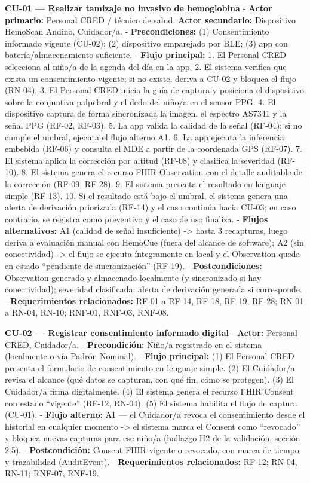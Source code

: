 \documentclass[11pt,a4paper]{article}
\begin{document}
\textbf{CU-01 --- Realizar tamizaje no invasivo de hemoglobina}
- \textbf{Actor primario:} Personal CRED / técnico de salud. \textbf{Actor secundario:} Dispositivo HemoScan Andino, Cuidador/a.
- \textbf{Precondiciones:} (1) Consentimiento informado vigente (CU-02); (2) dispositivo emparejado por BLE; (3) app con batería/almacenamiento suficiente.
- \textbf{Flujo principal:}
1. El Personal CRED selecciona al niño/a de la agenda del día en la app.
2. El sistema verifica que exista un consentimiento vigente; si no existe, deriva a CU-02 y bloquea el flujo (RN-04).
3. El Personal CRED inicia la guía de captura y posiciona el dispositivo sobre la conjuntiva palpebral y el dedo del niño/a en el sensor PPG.
4. El dispositivo captura de forma sincronizada la imagen, el espectro AS7341 y la señal PPG (RF-02, RF-03).
5. La app valida la calidad de la señal (RF-04); si no cumple el umbral, ejecuta el flujo alterno A1.
6. La app ejecuta la inferencia embebida (RF-06) y consulta el MDE a partir de la coordenada GPS (RF-07).
7. El sistema aplica la corrección por altitud (RF-08) y clasifica la severidad (RF-10).
8. El sistema genera el recurso FHIR Observation con el detalle auditable de la corrección (RF-09, RF-28).
9. El sistema presenta el resultado en lenguaje simple (RF-13).
10. Si el resultado está bajo el umbral, el sistema genera una alerta de derivación priorizada (RF-14) y el caso continúa hacia CU-03; en caso contrario, se registra como preventivo y el caso de uso finaliza.
- \textbf{Flujos alternativos:} A1 (calidad de señal insuficiente) -\textgreater{} hasta 3 recapturas, luego deriva a evaluación manual con HemoCue (fuera del alcance de software); A2 (sin conectividad) -\textgreater{} el flujo se ejecuta íntegramente en local y el Observation queda en estado ``pendiente de sincronización'' (RF-19).
- \textbf{Postcondiciones:} Observation generado y almacenado localmente (y sincronizado si hay conectividad); severidad clasificada; alerta de derivación generada si corresponde.
- \textbf{Requerimientos relacionados:} RF-01 a RF-14, RF-18, RF-19, RF-28; RN-01 a RN-04, RN-10; RNF-01, RNF-03, RNF-08.

\textbf{CU-02 --- Registrar consentimiento informado digital}
- \textbf{Actor:} Personal CRED, Cuidador/a.
- \textbf{Precondición:} Niño/a registrado en el sistema (localmente o vía Padrón Nominal).
- \textbf{Flujo principal:} (1) El Personal CRED presenta el formulario de consentimiento en lenguaje simple. (2) El Cuidador/a revisa el alcance (qué datos se capturan, con qué fin, cómo se protegen). (3) El Cuidador/a firma digitalmente. (4) El sistema genera el recurso FHIR Consent con estado ``vigente'' (RF-12, RN-04). (5) El sistema habilita el flujo de captura (CU-01).
- \textbf{Flujo alterno:} A1 --- el Cuidador/a revoca el consentimiento desde el historial en cualquier momento -\textgreater{} el sistema marca el Consent como ``revocado'' y bloquea nuevas capturas para ese niño/a (hallazgo H2 de la validación, sección 2.5).
- \textbf{Postcondición:} Consent FHIR vigente o revocado, con marca de tiempo y trazabilidad (AuditEvent).
- \textbf{Requerimientos relacionados:} RF-12; RN-04, RN-11; RNF-07, RNF-19.
\end{document}
